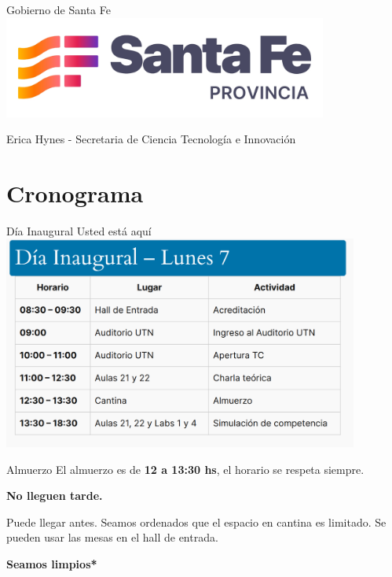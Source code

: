 \documentclass{beamer}
\begin{document}
\begin{frame}{Gobierno de Santa Fe}
    \centering
    \includegraphics[width=0.8\textwidth]{logos/santa_fe_logo_v2.jpg}
    
    \vspace{0.5cm}
    
    Erica Hynes - Secretaria de Ciencia Tecnología e Innovación
\end{frame}

\section{Cronograma}

\begin{frame}{Día Inaugural}
    Usted está aquí
    \centering
    \includegraphics[clip,height=7cm,keepaspectratio]{img/crono_01.png}
\end{frame}

\begin{frame}{Almuerzo}
    \centering
    El almuerzo es de {\bf 12 a 13:30 hs}, el horario se respeta siempre.
    
    {\bf No lleguen tarde.}
    
    \vspace{0.5cm}
    
    Puede llegar antes. Seamos ordenados que el espacio en cantina es limitado. Se pueden usar las mesas en el hall de entrada.
    
    {\bf *Seamos limpios*}
\end{frame}
\end{document}
